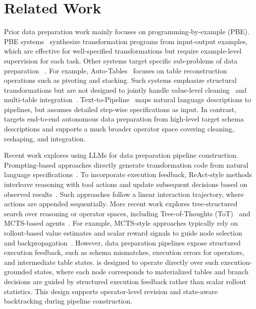 \section{Related Work}
\label{sec:related_work}

Prior data preparation work mainly focuses on programming-by-example (PBE).
PBE systems~\cite{barowy2015flashrelate, singh2016blinkfill, he2018transform, gulwani2012spreadsheet, jin2017foofah} synthesize transformation programs from input-output examples, which are effective for well-specified transformations but require example-level supervision for each task.
Other systems target specific sub-problems of data preparation ~\cite{yang2021auto, fan2024autoprep, lai2025auto, chen2025auto, DBLP:journals/pvldb/LiHYWC23,huang2018auto, fan2024cost}. For example, Auto-Tables~\cite{DBLP:journals/pvldb/LiHYWC23} focuses on table reconstruction operations such as pivoting and stacking. Such systems 
emphasize structural transformations but
are not designed to jointly handle value-level cleaning~\cite{chai2025cost} and multi-table integration~\cite{zhu2017auto}. Text-to-Pipeline~\cite{ge2025text} maps natural language descriptions to pipelines, but assumes detailed step-wise specifications as input.
In contrast, \sys targets end-to-end autonomous data preparation from high-level target schema descriptions and supports a much broader operator space covering cleaning, reshaping, and integration.

Recent work explores using LLMs for data preparation pipeline construction. Prompting-based approaches directly generate transformation code from natural language specifications~\cite{li2024towards,sapkota2025vibe,lai2025auto}. 
To incorporate execution feedback, ReAct-style methods interleave reasoning with tool actions and update subsequent decisions based on observed results~\cite{yao2023react, aksitov2023rest}. Such approaches follow a linear interaction trajectory, where actions are appended sequentially. More recent work explores tree-structured search over reasoning or operator spaces, including Tree-of-Thoughts (ToT)~\cite{yao2023tree} and MCTS-based agents~\cite{li2025alphasql, ge2025monteprep}. For example, MCTS-style approaches typically rely on rollout-based value estimates and scalar reward signals to guide node selection and backpropagation~\cite{hao2023reasoning}. However, data preparation pipelines expose structured execution feedback, such as schema mismatches, execution errors for operators, and intermediate table states. \sys is designed to operate directly over such execution-grounded states, where each node corresponds to materialized tables and branch decisions are guided by structured execution feedback rather than scalar rollout statistics. This design supports operator-level revision and state-aware backtracking during pipeline construction.

